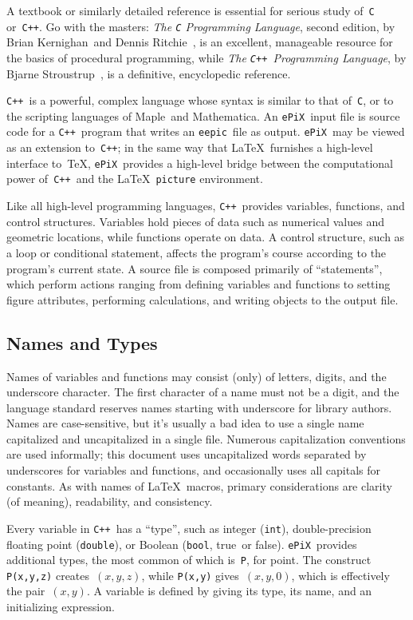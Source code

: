 \documentclass[12pt]{report}
\newcommand{\code}[1]{\texttt{#1}}
\newcommand{\ePiX}{\code{ePiX}}
\newcommand{\eepic}{\code{eepic}}
\newcommand{\C}{\code{C}}
\newcommand{\CXX}{\code{C++}}
\begin{document}
A textbook or similarly detailed reference is essential for serious
study of~\code{C} or~\CXX. Go with the masters: \emph{The \code{C}
  Programming Language}, second edition, by Brian Kernighan~and Dennis
Ritchie~\cite{KnR}, is an excellent, manageable resource for the
basics of procedural programming, while \emph{The \CXX~Programming
  Language}, by Bjarne Stroustrup~\cite{S}, is a definitive,
encyclopedic reference.

\CXX\ is a powerful, complex language whose syntax is similar to that
of~\C, or to the scripting languages of Maple~and Mathematica. An
\ePiX\ input file is source code for a \CXX~program that writes an
\eepic\ file as output.  \ePiX\ may be viewed as an extension to~\CXX;
in the same way that \LaTeX\ furnishes a high-level interface to~\TeX,
\ePiX\ provides a high-level bridge between the computational power
of~\CXX\ and the \LaTeX\ \code{picture} environment. 

Like all high-level programming languages, \CXX\ provides variables,
functions, and control structures. Variables hold pieces of data such
as numerical values and geometric locations, while functions operate
on data. A control structure, such as a loop or conditional statement,
affects the program's course according to the program's current state.
A source file is composed primarily of ``statements'', which perform
actions ranging from defining variables and functions to setting
figure attributes, performing calculations, and writing objects to the
output file.

\subsection*{Names and Types}

Names of variables and functions may consist (only) of letters,
digits, and the underscore character. The first character of a name
must not be a digit, and the language standard reserves names starting
with underscore for library authors. Names are case-sensitive, but
it's usually a bad idea to use a single name capitalized and
uncapitalized in a single file. Numerous capitalization conventions
are used informally; this document uses uncapitalized words separated
by underscores for variables and functions, and occasionally uses all
capitals for constants. As with names of \LaTeX\ macros, primary
considerations are clarity (of meaning), readability, and consistency.

Every variable in \CXX\ has a ``type'',
such as integer (\code{int}), double-precision floating point
(\code{double}), or Boolean (\code{bool}, true~or false).  \ePiX\ 
provides additional types, the most common of which is~\code{P}, for
point. The construct \code{P(x,y,z)} creates~$(x,y,z)$, while
\code{P(x,y)} gives~$(x,y,0)$, which is effectively the pair~$(x,y)$.
A variable is defined by giving its type, its name, and an
initializing expression.
\end{document}
